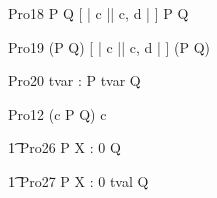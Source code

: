 \begin{circus}
    \circprocess Pro18 \circdef P \circtimeout {} \rcirctime Q [ | \lchanset c \rchanset || \lchanset c, d \rchanset | ] P \circtimeout {} \rcirctime Q \\
\end{circus}
 
\begin{circus}
    \circprocess Pro19 \circdef (P \circtimeout {} \rcirctime Q) [ | \lchanset c \rchanset || \lchanset c, d \rchanset | ] (P \circtimeout {} \rcirctime Q) \\
\end{circus}



\begin{circus}
    \circprocess Pro20 \circdef \circvres tvar : \nat  \circspot P \circtimeout \lcirctime tvar \rcirctime Q\\
\end{circus}   


\begin{circus}
    \circprocess Pro12 \circdef (c \then P \circtimeout {} \rcirctime Q) \circhide c \\
\end{circus} 
     
\begin{circus}
    \t1 Pro26 \circdef P \circtimeout \lcirctime X : 0  \rcirctime Q\\
\end{circus}        

\begin{circus}
    \t1 Pro27 \circdef P \circtimeout \lcirctime X : 0 \upto tval \rcirctime Q \\
\end{circus} 
